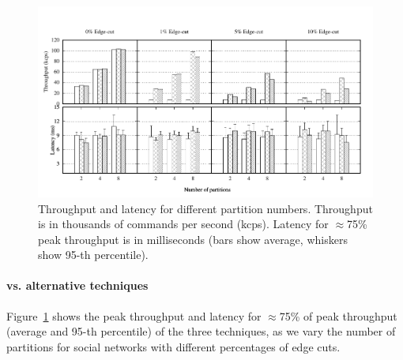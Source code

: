 \begin{figure}[ht!]
	\includegraphics{figures/experiments/social-network-tp-lat/social-network-tp-lat}
	\caption{Throughput and latency for different partition numbers. 
  Throughput is in thousands of commands per second (kcps). 
  Latency for $\approx$75\% peak throughput is in milliseconds (bars show average, whiskers show 95-th percentile).}
	\label{fig:varying_edge_cut}
\end{figure}






\paragraph*{\dynastar vs. alternative techniques}
\label{sec:evaluation:results}

Figure~\ref{fig:varying_edge_cut} shows the peak throughput and latency for $\approx$75\% of peak throughput (average and 95-th percentile) of the three techniques, 
as we vary the number of partitions for social networks with different percentages of edge cuts.

